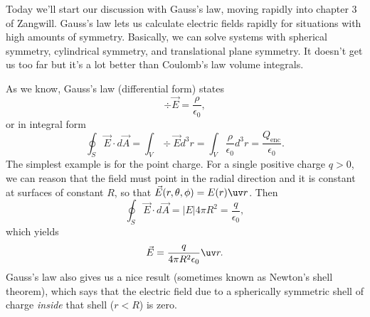 Today we'll start our discussion with Gauss's law, moving rapidly into chapter 3 of Zangwill. Gauss's law lets us calculate electric fields rapidly for situations with high amounts of symmetry. Basically, we can solve systems with spherical symmetry, cylindrical symmetry, and translational plane symmetry. It doesn't get us too far but it's a lot better than Coulomb's law volume integrals.

As we know, Gauss's law (differential form) states
\begin{equation}
    \div \vec E = \frac{\rho}{\epsilon_0},
\end{equation}
or in integral form
\begin{equation}
    \oint_S \vec E \cdot d\vec A = \int_V \div \vec E d^3 r = \int_V \frac{\rho}{\epsilon_0} d^3 r = \frac{Q_\text{enc}}{\epsilon_0}.
\end{equation}
The simplest example is for the point charge. For a single positive charge $q>0$, we can reason that the field must point in the radial direction and it is constant at surfaces of constant $R$, so that $\vec E(r,\theta,\phi) = E(r) \uv r$. Then
\begin{equation}
    \oint_S \vec E \cdot d\vec A = |E| 4\pi R^2 = \frac{q}{\epsilon_0},
\end{equation}
which yields
\begin{equation}
    \vec{E} = \frac{q}{4\pi R^2 \epsilon_0} \uv r.
\end{equation}
Gauss's law also gives us a nice result (sometimes known as Newton's shell theorem), which says that the electric field due to a spherically symmetric shell of charge \emph{inside} that shell ($r<R$) is zero.

